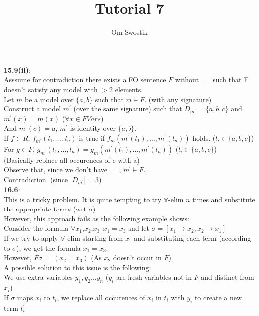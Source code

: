 \documentclass{article}
\title{\textbf{Tutorial 7}}
\author{Om Swostik}
\date{}
\begin{document}
\maketitle
\begin{flushleft}
\textbf{15.9(ii)}: \\
Asssume for contradiction there exists a FO sentence $F$ without $=$ such that F doesn't satisfy any model with $> 2$ elements.\\
Let $m$ be a model over $\{a,b\}$ such that $m \models F$. (with any signature)\\
Construct a model $m^{'}$ (over the same signature) such that $D_{m^{'}}=\{a,b,c\}$ and $m^{'}(x)=m(x)$ ($\forall x\in FVars$)\\
And $m^{'}(c)=a$, $m^{'}$ is identity over $\{a,b\}$.\\
If $f\in R$, $f_{m^{'}}(l_1,\dots,l_n)$ is true if $f_m(m^{'}(l_1),\dots,m^{'}(l_n))$ holds. ($l_i \in \{a,b,c\}$)\\
For $g\in F$, $g_{m^{'}}(l_1,\dots,l_n)= g_m(m^{'}(l_1),\dots,m^{'}(l_n))$ ($l_i \in \{a,b,c\}$) \\
(Basically replace all occurences of c with a)\\
Observe that, since we don't have $=$, $m^{'}\models F$.\\
Contradiction. (since $|D_{m^{'}}|=3$)\\
\textbf{16.6}: \\
This is a tricky problem. It is quite tempting to try $\forall$-elim $n$ times and substitute the appropriate terms (wrt $\sigma$)\\
However, this approach fails as the following example shows:\\       
Consider the formula $\forall x_1\text{,}x_2\text{,}x_3\:\: x_1=x_3$ and let $\sigma= [x_1\rightarrow x_2,x_2\rightarrow x_1]$\\
If we try to apply $\forall$-elim starting from $x_1$ and substituting each term (according to $\sigma$), we get the formula $x_1=x_3$.\\
However, $F\sigma= \:(x_2=x_3)$  (As $x_2$ doesn't occur in $F$)\\
A possible solution to this issue is the following: \\
We use extra variables $y_1,y_2\dots y_n$  ($y_i$ are fresh variables not in $F$ and distinct from $x_i$)\\
If $\sigma$ maps $x_i$ to $t_i$, we replace all occurences of $x_i$ in $t_i$ with $y_i$ to create a new term $t_i^{'}$\\

\end{flushleft}
\end{document}
